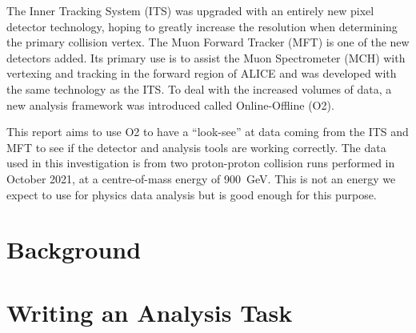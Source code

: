 \documentclass[11pt]{article}
\numberwithin{equation}{section}
\numberwithin{figure}{section}
\numberwithin{table}{section}
\begin{document}
The Inner Tracking System (ITS) was upgraded with an entirely new pixel detector technology, hoping to greatly increase the resolution when determining the primary collision vertex. The Muon Forward Tracker (MFT) is one of the new detectors added. Its primary use is to assist the Muon Spectrometer (MCH) with vertexing and tracking in the forward region of ALICE and was developed with the same technology as the ITS. To deal with the increased volumes of data, a new analysis framework was introduced called Online-Offline (O2).

This report aims to use O2 to have a ``look-see'' at data coming from the ITS and MFT to see if the detector and analysis tools are working correctly. The data used in this investigation is from two proton-proton collision runs performed in October 2021, at a centre-of-mass energy of \SI{900}{\giga\electronvolt}. This is not an energy we expect to use for physics data analysis but is good enough for this purpose.

\section{Background}\label{sec:Background}


\section{Writing an Analysis Task}\label{sec:AnalysisTask}



\newpage
\printbibliography
\end{document}
